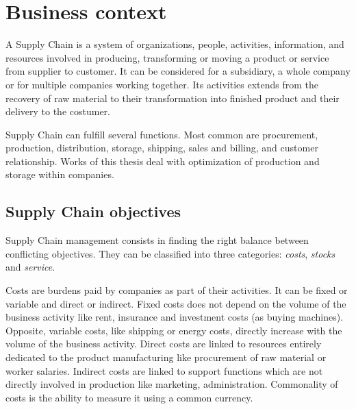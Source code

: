 \chapter{Business context}
\label{chap:business-context}


A Supply Chain is a system of organizations, people, activities, information, and resources involved in producing, transforming or moving a product or service from supplier to customer.
It can be considered for a subsidiary, a whole company or for multiple companies working together.
Its activities extends from the recovery of raw material to their transformation into finished product and their delivery to the costumer.

Supply Chain can fulfill several functions.
Most common are procurement, production, distribution, storage, shipping, sales and billing, and customer relationship.
Works of this thesis deal with optimization of production and storage within companies.


\section{Supply Chain objectives}



Supply Chain management consists in finding the right balance between conflicting objectives.
They can be classified into three categories: \emph{costs}, \emph{stocks} and \emph{service}.


Costs are burdens paid by companies as part of their activities.
It can be fixed or variable and direct or indirect.
Fixed costs does not depend on the volume of the business activity like rent, insurance and investment costs (as buying machines).
Opposite, variable costs, like shipping or energy costs, directly increase with the volume of the business activity.
Direct costs are linked to resources entirely dedicated to the product manufacturing like procurement of raw material or worker salaries.
Indirect costs are linked to support functions which are not directly involved in production like marketing, administration.
Commonality of costs is the ability to measure it using a common currency.

